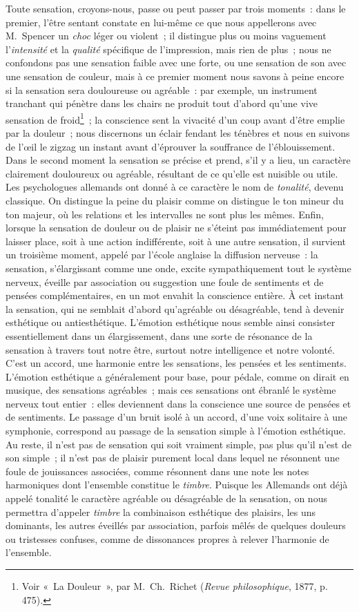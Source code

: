 \documentclass[french,twoside]{book} %
\begin{document}
Toute sensation, croyons-nous, passe ou peut passer par trois moments : dans le premier, l’être sentant constate en lui-même ce que nous appellerons avec M. Spencer un \emph{choc} léger ou violent ; il distingue plus ou moins vaguement l’\emph{intensité} et la \emph{qualité} spécifique de l’impression, mais rien de plus ; nous ne confondons pas une sensation faible avec une forte, ou une sensation de son avec une sensation de couleur, mais à ce premier moment nous savons à peine encore si la sensation sera douloureuse ou agréable : par exemple, un instrument tranchant qui pénètre dans les chairs ne produit tout d’abord qu’une vive sensation de  froid\footnote{Voir « La Douleur », par M. Ch. Richet (\emph{Revue philosophique}, 1877, p. 475).} ; la conscience sent la vivacité d’un coup avant d’être emplie par la douleur ; nous discernons un éclair fendant les ténèbres et nous en suivons de l’œil le zigzag un instant avant d’éprouver la souffrance de l’éblouissement. Dans le second moment la sensation se précise et prend, s’il y a lieu, un caractère clairement douloureux ou agréable, résultant de ce qu’elle est nuisible ou utile. Les psychologues allemands ont donné à ce caractère le nom de \emph{tonalité}, devenu classique. On distingue la peine du plaisir comme on distingue le ton mineur du ton majeur, où les relations et les intervalles ne sont plus les mêmes. Enfin, lorsque la sensation de douleur ou de plaisir ne s’éteint pas immédiatement pour laisser place, soit à une action indifférente, soit à une autre sensation, il survient un troisième moment, appelé par l’école anglaise la diffusion nerveuse : la sensation, s’élargissant comme une onde, excite sympathiquement tout le système nerveux, éveille par association ou suggestion une foule de sentiments et de pensées complémentaires, en un mot envahit la conscience entière. À cet instant la sensation, qui ne semblait d’abord qu’agréable ou désagréable, tend à devenir esthétique ou antiesthétique. L’émotion esthétique nous semble ainsi consister essentiellement dans un élargissement, dans une sorte de résonance de la sensation à travers tout notre être, surtout notre intelligence et notre volonté. C’est un accord, une harmonie entre les sensations, les pensées et les sentiments. L’émotion esthétique  a généralement pour base, pour pédale, comme on dirait en musique, des sensations agréables ; mais ces sensations ont ébranlé le système nerveux tout entier : elles deviennent dans la conscience une source de pensées et de sentiments. Le passage d’un bruit isolé à un accord, d’une voix solitaire à une symphonie, correspond au passage de la sensation simple à l’émotion esthétique. Au reste, il n’est pas de sensation qui soit vraiment simple, pas plus qu’il n’est de son simple ; il n’est pas de plaisir purement local dans lequel ne résonnent une foule de jouissances associées, comme résonnent dans une note les notes harmoniques dont l’ensemble constitue le \emph{timbre}. Puisque les Allemands ont déjà appelé tonalité le caractère agréable ou désagréable de la sensation, on nous permettra d’appeler \emph{timbre} la combinaison esthétique des plaisirs, les uns dominants, les autres éveillés par association, parfois mêlés de quelques douleurs ou tristesses confuses, comme de dissonances propres à relever l’harmonie de l’ensemble. 
\end{document}
